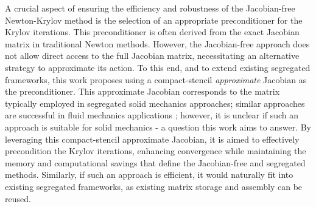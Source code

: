 \documentclass[sn-mathphys,Numbered]{sn-jnl}%
\begin{document}
A crucial aspect of ensuring the efficiency and robustness of the Jacobian-free Newton-Krylov method is the selection of an appropriate preconditioner for the Krylov iterations.
This preconditioner is often derived from the exact Jacobian matrix in traditional Newton methods.
However, the Jacobian-free approach does not allow direct access to the full Jacobian matrix, necessitating an alternative strategy to approximate its action.
To this end, and to extend existing segregated frameworks, this work proposes using a compact-stencil \emph{approximate} Jacobian as the preconditioner. This approximate Jacobian corresponds to the matrix typically employed in segregated solid mechanics approaches; similar approaches are successful in fluid mechanics applications \citep{Mchugh1994, Qin2000, Geuzaine2001, Pernice2001, Knoll2004, Nejat2008, Vaassen2008, Lucas2010, Nejat2011, Nishikawa2020}; however, it is unclear if such an approach is suitable for solid mechanics - a question this work aims to answer.
By leveraging this compact-stencil approximate Jacobian, it is aimed to effectively precondition the Krylov iterations, enhancing convergence while maintaining the memory and computational savings that define the Jacobian-free and segregated methods.
Similarly, if such an approach is efficient, it would naturally fit into existing segregated frameworks, as existing matrix storage and assembly can be reused.

\end{document}
